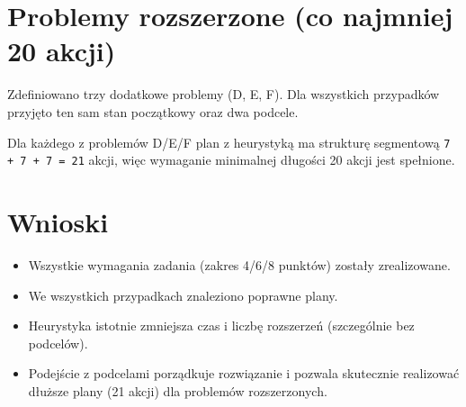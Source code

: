 \documentclass[12pt,a4paper]{article}
\begin{document}
\begin{table}[h]
\centering
{}
\caption{Bezpośrednie porównanie różnic czasów i przyspieszeń między wymaganymi wariantami.}
\end{table}

\section{Problemy rozszerzone (co najmniej 20 akcji)}
Zdefiniowano trzy dodatkowe problemy (D, E, F). Dla wszystkich przypadków przyjęto ten sam stan początkowy oraz dwa podcele.

\begin{table}[h]
\centering
{}
\caption{Wyniki dla dodatkowych problemów z podcelami.}
\end{table}

Dla każdego z problemów D/E/F plan z heurystyką ma strukturę segmentową \texttt{7 + 7 + 7 = 21} akcji, więc wymaganie minimalnej długości 20 akcji jest spełnione.

\section{Wnioski}
\begin{itemize}
    \item Wszystkie wymagania zadania (zakres 4/6/8 punktów) zostały zrealizowane.
    \item We wszystkich przypadkach znaleziono poprawne plany.
    \item Heurystyka istotnie zmniejsza czas i liczbę rozszerzeń (szczególnie bez podcelów).
    \item Podejście z podcelami porządkuje rozwiązanie i pozwala skutecznie realizować dłuższe plany (21 akcji) dla problemów rozszerzonych.
\end{itemize}
\end{document}
